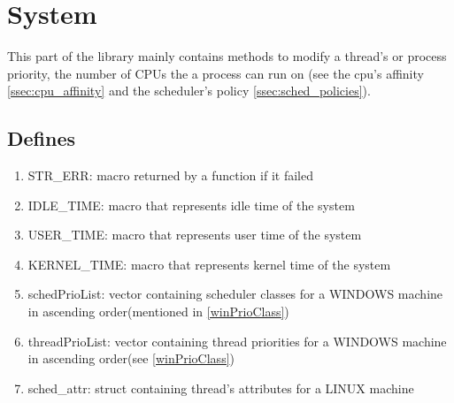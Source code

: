\section{System}
This part of the library mainly contains methods to modify a thread's or process priority, the number of CPUs the a process can run on (see the cpu's affinity \ref{ssec:cpu_affinity} and the scheduler's policy \ref{ssec:sched_policies}).
\subsection{Defines}
\begin{enumerate}
	\item STR\_ERR: macro returned by a function if it failed
	\item IDLE\_TIME: macro that represents idle time of the system
	\item USER\_TIME: macro that represents user time of the system
	\item KERNEL\_TIME: macro that represents kernel time of the system
	\item schedPrioList: vector containing scheduler classes for a WINDOWS machine in ascending order(mentioned in \ref*{winPrioClass})
	\item threadPrioList: vector containing thread priorities for a WINDOWS machine in ascending order(see \ref*{winPrioClass})
	\item sched\_attr: struct containing thread's attributes for a LINUX machine
\end{enumerate}
